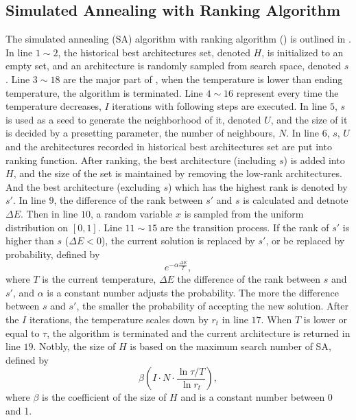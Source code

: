 \documentclass[sigconf]{acmart}
\begin{document}
    \subsection{Simulated Annealing with Ranking Algorithm}
    The simulated annealing (SA) algorithm with ranking algorithm (\palg{})
    is outlined in . In line $1\sim2$, the historical best architectures 
    set, denoted $H$, is initialized to an empty set, and an architecture is randomly sampled from 
    search space, denoted $s$. Line $3\sim18$ are the major part of \palg{}, when the temperature 
    is lower than ending temperature, the algorithm is terminated. Line $4\sim16$ 
    represent every time the temperature decreases, $I$ iterations with following steps are executed. 
    In line $5$, $s$ is used as a seed to generate the neighborhood of it, denoted $U$, 
    and the size of it is decided by a presetting parameter, the number of neighbours, $N$. 
    In line $6$, $s$, $U$ and the architectures recorded in historical best architectures set are 
    put into ranking function. 
    After ranking, the best architecture (including $s$) is added into $H$, and the size of the set is 
    maintained by removing the low-rank architectures. 
    And the best architecture (excluding $s$) which has the highest rank is denoted by $s'$. 
    In line $9$, the difference of the rank between $s'$ and $s$ is calculated and detnote $\Delta E$. 
    Then in line $10$, a random variable $x$ is sampled from the uniform distribution on $[0,1]$. 
    Line $11\sim15$ are the transition process. If the rank of $s'$ is higher than $s$ ($\Delta E<0$), 
    the current solution is replaced by $s'$, or be replaced by probability, defined by 
    \begin{equation}
        \label{equ:SA_rk_prob}
        e^{-\alpha\frac{\Delta E}{T}},
    \end{equation}
    where $T$ is the current temperature, $\Delta E$ the difference of the rank between 
    $s$ and $s'$, and $\alpha$ is a constant number adjusts the probability. The more 
    the difference between $s$ and $s'$, the smaller the probability of accepting the new solution. 
    After the $I$ iterations, the temperature scales down by $r_t$ in line $17$. When $T$ is 
    lower or equal to $\tau$, the algorithm is terminated and the current architecture is returned in line $19$. 
    Notbly, the size of $H$ is based on the maximum search number of SA, defined by 
    \begin{equation}
        \label{equ:SA_rk_size_of_H}
        \beta (I\cdot N\cdot\frac{\ln{\tau/T}}{\ln{r_t}}),
    \end{equation}
    where $\beta$ is the coefficient of the size of $H$ and is a constant number between 0 and 1.
\end{document}
